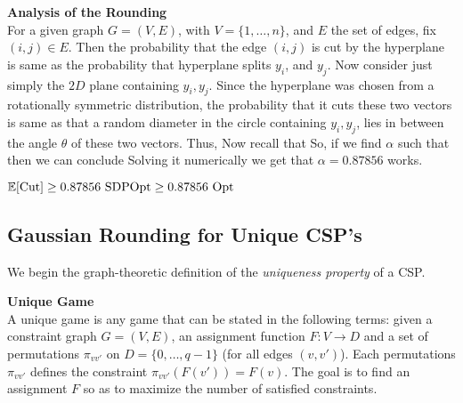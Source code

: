 {\bf Analysis of the Rounding} \\
For a given graph $G = (V, E)$, with $V =\{1, \ldots, n\}$, and $E$ the set of edges, fix $(i, j) \in E$. Then the probability that the edge $(i, j)$ is cut by the hyperplane is same as the probability that hyperplane splits $y_i$, and $y_j$. 
Now consider just simply the $2D$ plane containing $y_i, y_j$. Since the hyperplane was chosen from a rotationally symmetric distribution, the probability that it cuts these two vectors is same as that a random diameter in the circle containing $y_i, y_j$, lies in between the angle $\theta$ of these two vectors. Thus, 
Now recall that 
So, if we find $\alpha$ such that 
then we can conclude 
Solving it numerically we get that $\alpha = 0.87856$ works.
\begin{remark}
$\Ex[\mbox{Cut}]  \geq 0.87856 \mbox{\ SDPOpt} \geq 0.87856 \mbox{\ Opt }$
\end{remark} 
 
 \subsection{Gaussian Rounding for Unique CSP's}

We begin the graph-theoretic definition of the \textit{uniqueness property} of a CSP.
\begin{definition}{\bf Unique Game}\\
A unique game is any game that can be stated in the following terms: given a constraint graph $G = (V, E)$, an assignment function $F: V \rightarrow D$ and a set of permutations $\pi_{vv'}$ on $D = \{0, \ldots, q-1 \}$ (for all edges $(v, v')$). Each permutations $\pi_{vv'}$ defines the constraint $\pi_{vv'}(F(v'))=F(v)$. The goal is to find an assignment $F$ so as to maximize the number of satisfied constraints.
\end{definition}

